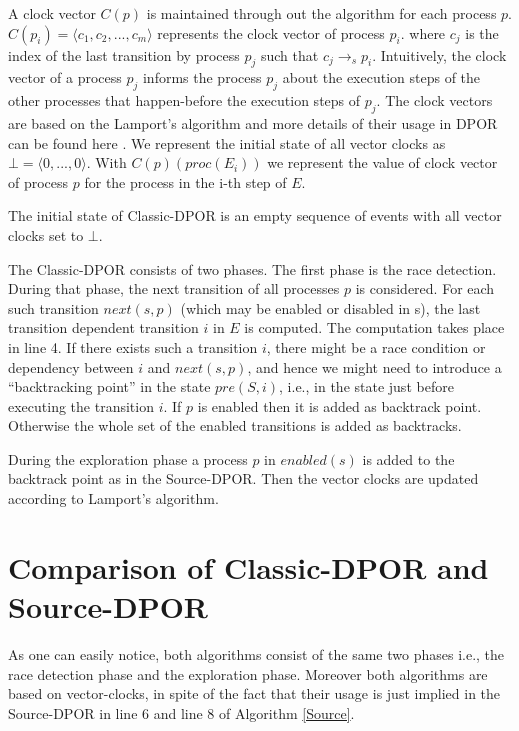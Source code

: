 A clock vector $C(p)$ is maintained through out the algorithm for each process $p$. $C(p_i) = \langle c_1, c_2, ..., c_m \rangle$ represents the clock vector of process $p_i$.
where $c_j$ is the index of the last transition by process $p_j$ such that
$c_j \rightarrow_s p_i$. Intuitively, the clock vector of a process $p_j$ informs the process $p_j$ about the execution steps of the other processes that 
happen-before the execution steps of $p_j$. The clock vectors are based on the Lamport's algorithm \cite{Lamport@CACM-89} and more details of their usage in DPOR can
be found here \cite{FlanaganDPOR}. We represent the initial state of all vector clocks as $\bot = \langle 0, ..., 0 \rangle$. With $C(p)(proc(E_i ))$ we represent the 
value of clock vector of process $p$ for the process in the i-th step of $E$.

The initial state of Classic-DPOR is an empty sequence of events with all vector clocks set to $\bot$.

The Classic-DPOR consists of two phases. The first phase is the race detection. During that phase, the next transition
of all processes $p$ is considered.
For each such transition $next(s, p)$ (which may be enabled or disabled
in s), the last transition dependent transition  $i$ in $E$ is computed.
The computation takes place in line 4.
If there exists such a transition $i$, there might be a race
condition or dependency between $i$ and $next(s, p)$, and hence
we might need to introduce a “backtracking point” in the
state $pre(S, i)$, i.e., in the state just before executing the
transition $i$. If $p$ is enabled then it is added as backtrack point. Otherwise the whole set of the 
enabled transitions is added as backtracks.

During the exploration phase a process $p$ in $enabled(s)$ is added to the backtrack point as in the Source-DPOR. 
Then the vector clocks are updated according to Lamport's algorithm.

\section{Comparison of Classic-DPOR and Source-DPOR}

As one can easily notice, both algorithms consist of the same two phases i.e., the race detection phase and the exploration phase. Moreover both
algorithms are based on vector-clocks, in spite of the fact that their usage is just implied in the Source-DPOR in line 6 and line 8 of Algorithm \ref{Source}.

